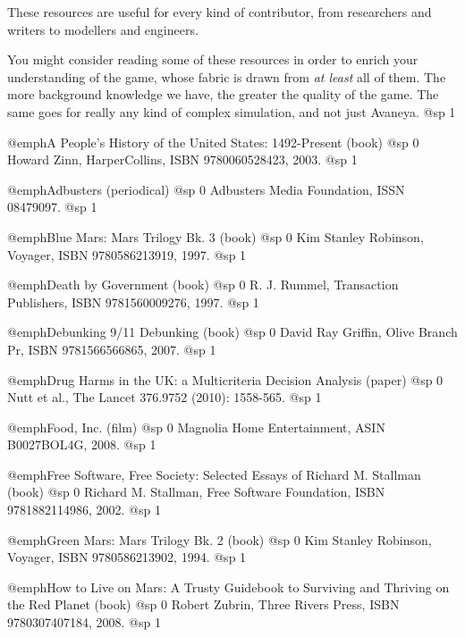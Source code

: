 These resources are useful for every kind of contributor, from researchers and writers to modellers and engineers.

You might consider reading some of these resources in order to enrich your understanding of the game, whose fabric is drawn from {\it at least} all of them. The more background knowledge we have, the greater the quality of the game. The same goes for really any kind of complex simulation, and not just Avaneya.
@sp 1

\itemize

\item
@emph{A People's History of the United States: 1492-Present} (book)
@sp 0
Howard Zinn, HarperCollins, ISBN 9780060528423, 2003.
@sp 1

\item
@emph{Adbusters} (periodical)
@sp 0
Adbusters Media Foundation, ISSN 08479097.
@sp 1

\item
@emph{Blue Mars: Mars Trilogy Bk. 3} (book)
@sp 0
Kim Stanley Robinson, Voyager, ISBN 9780586213919, 1997.
@sp 1

\item
@emph{Death by Government} (book)
@sp 0
R. J. Rummel, Transaction Publishers, ISBN 9781560009276, 1997.
@sp 1

\item
@emph{Debunking 9/11 Debunking} (book)
@sp 0
David Ray Griffin, Olive Branch Pr, ISBN 9781566566865, 2007.
@sp 1

\item
@emph{Drug Harms in the UK: a Multicriteria Decision Analysis} (paper)
@sp 0
Nutt et al., The Lancet 376.9752 (2010): 1558-565.
@sp 1

\item
@emph{Food, Inc.} (film)
@sp 0
Magnolia Home Entertainment, ASIN B0027BOL4G, 2008.
@sp 1

\item
@emph{Free Software, Free Society: Selected Essays of Richard M. Stallman} (book)
@sp 0
Richard M. Stallman, Free Software Foundation, ISBN 9781882114986, 2002.
@sp 1

\item
@emph{Green Mars: Mars Trilogy Bk. 2} (book)
@sp 0
Kim Stanley Robinson, Voyager, ISBN 9780586213902, 1994.
@sp 1

\item
@emph{How to Live on Mars: A Trusty Guidebook to Surviving and Thriving on the Red Planet} (book)
@sp 0
Robert Zubrin, Three Rivers Press, ISBN 9780307407184, 2008.
@sp 1

